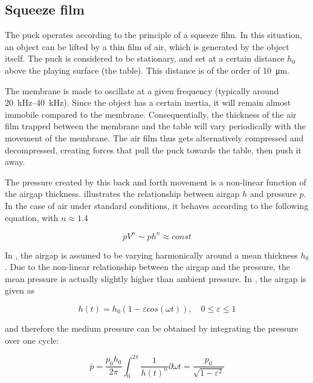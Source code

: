 \subsection{Squeeze film}

The puck operates according to the principle of a squeeze film. In this
situation, an object can be lifted by a thin film of air, which is generated by
the object itself. The puck is considered to be stationary, and set at a certain
distance $h_0$ above the playing surface (the table). This distance is of the
order of \SI{10}{\micro\metre}.

The membrane is made to oscillate at a given frequency (typically around
\SIrange{20}{40}{\kilo\hertz}). Since the object has a certain inertia, it will
remain almost immobile compared to the membrane. Consequentially, the thickness
of the air film trapped between the membrane and the table will vary
periodically with the movement of the membrane. The air film thus gets
alternatively compressed and decompressed, creating forces that pull the puck
towards the table, then push it away. 

The pressure created by this back and forth movement is a non-linear function of
the airgap thickness.  illustrates the
relationship between airgap $h$ and pressure $p$. In the case of air under
standard conditions, it behaves according to the following equation, with $n
\approx 1.4$

\begin{equation}
  pV^{n} \sim ph^{n} \approx const
  \label{eqn:pv-ph}
\end{equation}

In , the airgap is assumed to be varying
harmonically around a mean thickness $h_0$. Due to the non-linear relationship
between the airgap and the pressure, the mean pressure is actually slightly
higher than ambient pressure. In \cite{wiesendanger2001}, the airgap is given as

\begin{equation}
  h(t) = h_0 (1 - \varepsilon cos(\omega t)), \quad 0 \leq \varepsilon \leq 1
  \label{eqn:airgap-periodic}
\end{equation}

and therefore the medium pressure can be obtained by integrating the pressure
over one cycle:

\begin{equation}
  \bar{p} = 
  \frac{p_0 h_0}{2\pi} \int_{0}^{2\pi}\!\frac{1}{h(t)^n} \partial \omega t = 
  \frac{p_0}{\sqrt{1-\varepsilon^2}}
  \label{eqn:pmean}
\end{equation}

